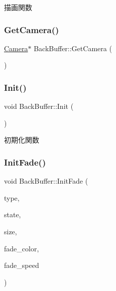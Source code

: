 描画関数 

\mbox{\label{class_back_buffer_addd0da33667c19cfba7f1d81009486f2}} 
\subsubsection{\texorpdfstring{Get\+Camera()}{GetCamera()}}
{\footnotesize\ttfamily \mbox{\hyperlink{class_camera}{Camera}}$\ast$ Back\+Buffer\+::\+Get\+Camera (\begin{DoxyParamCaption}{ }\end{DoxyParamCaption})\hspace{0.3cm}{\ttfamily [inline]}}

\mbox{\label{class_back_buffer_a65ac0a652db2a558ecda120ef3f47a10}} 
\subsubsection{\texorpdfstring{Init()}{Init()}}
{\footnotesize\ttfamily void Back\+Buffer\+::\+Init (\begin{DoxyParamCaption}{ }\end{DoxyParamCaption})}



初期化関数 

\mbox{\label{class_back_buffer_add3a034c7758dc6a72bb4582bf6ce78e}} 
\subsubsection{\texorpdfstring{Init\+Fade()}{InitFade()}}
{\footnotesize\ttfamily void Back\+Buffer\+::\+Init\+Fade (\begin{DoxyParamCaption}\item[{\mbox{\hyperlink{class_fade_ac06f27215b454aa05b93c236476d6e80}{Fade\+::\+Type}}}]{type,  }\item[{\mbox{\hyperlink{class_fade_ae77826bf3ff2ab95fb7b3b6f95cba80a}{Fade\+::\+State}}}]{state,  }\item[{\mbox{\hyperlink{_vector3_d_8h_a5ef6e95dfc5f9d3820b71772d99bbc25}{Vec2}}}]{size,  }\item[{\mbox{\hyperlink{_vector3_d_8h_a680c30c4a07d86fe763c7e01169cd6cc}{X\+Color4}}}]{fade\+\_\+color,  }\item[{float}]{fade\+\_\+speed }\end{DoxyParamCaption})}



